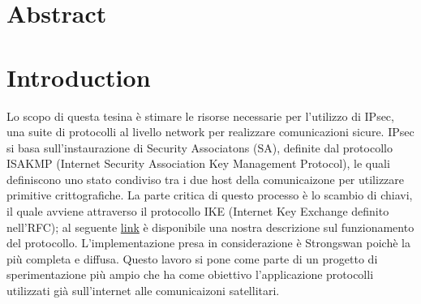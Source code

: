 \documentclass[
10pt, %
a4paper, %
oneside, %
headinclude,footinclude, %
BCOR5mm, %
]{scrartcl}
\title{\normalfont\spacedallcaps{IKEv2 Testing}}
\author{\spacedlowsmallcaps{Davide De Zuane \& Rahmi El Mechri}}
\date{}
\begin{document}
\renewcommand{\sectionmark}[1]{\markright{\spacedlowsmallcaps{#1}}}
\lehead{\mbox{\llap{\small\thepage\kern1em\color{halfgray} \vline}\color{halfgray}\hspace{0.5em}\rightmark\hfil}} 
\pagestyle{scrheadings} 

\maketitle
\newpage
\setcounter{tocdepth}{2} 
\tableofcontents 

\section*{Abstract} 


\newpage
\section{Introduction}
Lo scopo di questa tesina è stimare le risorse necessarie per l'utilizzo di IPsec, una suite di protocolli al livello network per realizzare comunicazioni sicure.
IPsec si basa sull'instaurazione di Security Associatons (SA), definite dal protocollo ISAKMP (Internet Security Association Key Management Protocol), le quali definiscono uno stato condiviso tra i due host della comunicaizone per utilizzare
primitive crittografiche. La parte critica di questo processo è lo scambio di chiavi, il quale avviene attraverso il protocollo IKE (Internet Key Exchange definito nell'RFC\cite{rfc7296}); al seguente \href{https://wiki.fullmetallinux.org/linux/security/Strongswan}{link} è disponibile una nostra descrizione sul funzionamento del protocollo.
L'implementazione presa in considerazione è Strongswan poichè la più completa e diffusa. 
Questo lavoro si pone come parte di un progetto di sperimentazione più ampio che ha come obiettivo l'applicazione protocolli utilizzati già sull'internet alle comunicaizoni satellitari.
\\
\end{document}
